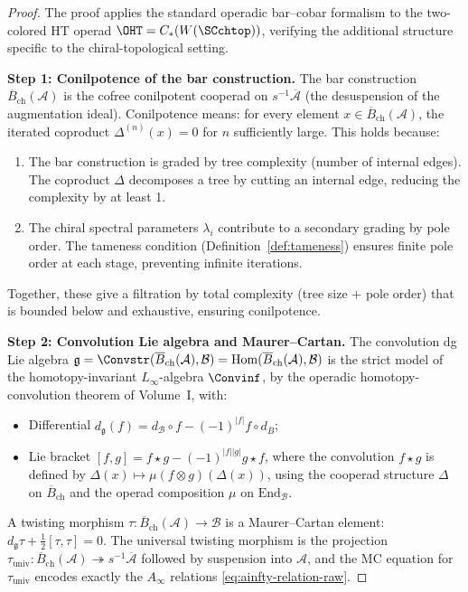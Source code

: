 \begin{proof}
The proof applies the standard operadic bar--cobar formalism \cite{BV73,MSS02} to the two-colored HT operad $\OHT = C_\ast(W(\SCchtop))$, verifying the additional structure specific to the chiral-topological setting.

\textbf{Step 1: Conilpotence of the bar construction.}
The bar construction $\overline{B}_{\mathrm{ch}}(\mathcal{A})$ is the cofree conilpotent cooperad on $s^{-1}\overline{\mathcal{A}}$ (the desuspension of the augmentation ideal). Conilpotence means: for every element $x \in \overline{B}_{\mathrm{ch}}(\mathcal{A})$, the iterated coproduct $\Delta^{(n)}(x) = 0$ for $n$ sufficiently large. This holds because:
\begin{enumerate}[label=(\alph*)]
\item The bar construction is graded by tree complexity (number of internal edges). The coproduct $\Delta$ decomposes a tree by cutting an internal edge, reducing the complexity by at least 1.
\item The chiral spectral parameters $\lambda_i$ contribute to a secondary grading by pole order. The tameness condition (Definition~\ref{def:tameness}) ensures finite pole order at each stage, preventing infinite iterations.
\end{enumerate}
Together, these give a filtration by total complexity (tree size + pole order) that is bounded below and exhaustive, ensuring conilpotence.

\textbf{Step 2: Convolution Lie algebra and Maurer--Cartan.}
The convolution dg Lie algebra
$\mathfrak{g} = \Convstr(\overline{B}_{\mathrm{ch}}(\mathcal{A}), \mathcal{B})
= \mathrm{Hom}(\overline{B}_{\mathrm{ch}}(\mathcal{A}), \mathcal{B})$
is the strict model of the homotopy-invariant $L_\infty$-algebra
$\Convinf$, by the operadic homotopy-convolution theorem of Volume~I,
with:
\begin{itemize}
\item Differential $d_{\mathfrak{g}}(f) = d_{\mathcal{B}} \circ f - (-1)^{|f|} f \circ d_{\overline{B}}$;
\item Lie bracket $[f,g] = f \star g - (-1)^{|f||g|} g \star f$, where the convolution $f \star g$ is defined by $\Delta(x) \mapsto \mu(f \otimes g)(\Delta(x))$, using the cooperad structure $\Delta$ on $\overline{B}_{\mathrm{ch}}$ and the operad composition $\mu$ on $\mathrm{End}_{\mathcal{B}}$.
\end{itemize}
A twisting morphism
$\tau: \overline{B}_{\mathrm{ch}}(\mathcal{A}) \to \mathcal{B}$
is a Maurer--Cartan element:
$d_{\mathfrak{g}}\tau + \frac{1}{2}[\tau,\tau] = 0$. The universal
twisting morphism is the projection
$\tau_{\mathrm{univ}}:
\overline{B}_{\mathrm{ch}}(\mathcal{A}) \twoheadrightarrow
s^{-1}\overline{\mathcal{A}}$ followed by suspension into
$\mathcal{A}$, and the MC equation for $\tau_{\mathrm{univ}}$
encodes exactly the $A_\infty$ relations
\eqref{eq:ainfty-relation-raw}.


\end{proof}
